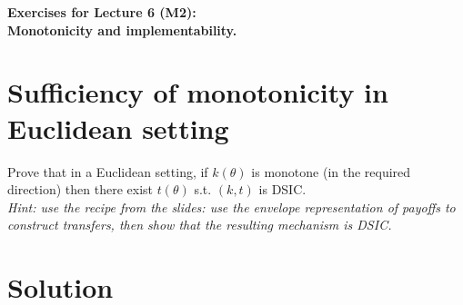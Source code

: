 \documentclass[a4paper]{article}
\newif\ifsolutions
\begin{document}
\begin{center}
		\LARGE\textbf{Exercises for Lecture 6 (M2):\\ Monotonicity and implementability.}
\end{center}




%
%



\section{Sufficiency of monotonicity in Euclidean setting}

	Prove that in a Euclidean setting, if $k(\theta)$ is monotone (in the required direction) then there exist $t(\theta)$ s.t. $(k,t)$ is DSIC.\\
	\emph{Hint: use the recipe from the slides: use the envelope representation of payoffs to construct transfers, then show that the resulting mechanism is DSIC.}

\ifsolutions
\section*{Solution}
\end{document}
